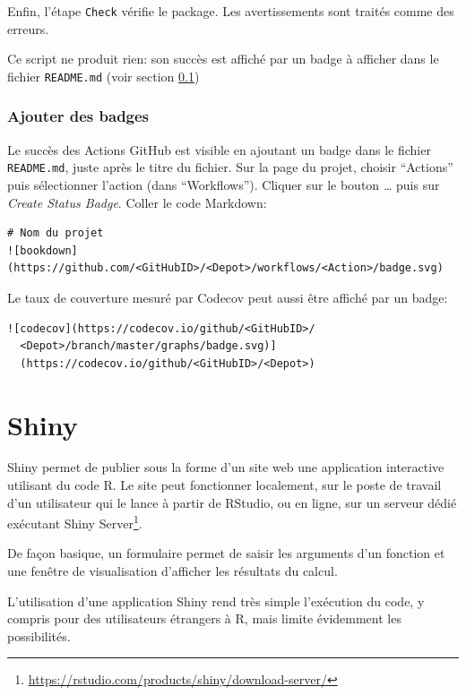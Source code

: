 \documentclass[
  11pt,
  french,
  a4paper,
  extrafontsizes,onecolumn,openright
  ]{memoir}
\begin{document}
Enfin, l'étape \texttt{Check} vérifie le package.
Les avertissements sont traités comme des erreurs.

Ce script ne produit rien: son succès est affiché par un badge à afficher dans le fichier \texttt{README.md} (voir section \ref{sec:ci-badges})

\hypertarget{sec:ci-badges}{%
\subsection{Ajouter des badges}\label{sec:ci-badges}}

Le succès des Actions GitHub est visible en ajoutant un badge dans le fichier \texttt{README.md}, juste après le titre du fichier.
Sur la page du projet, choisir ``Actions'' puis sélectionner l'action (dans ``Workflows'').
Cliquer sur le bouton \emph{\ldots{}} puis sur \emph{Create Status Badge}.
Coller le code Markdown:

\begin{verbatim}
# Nom du projet
![bookdown](https://github.com/<GitHubID>/<Depot>/workflows/<Action>/badge.svg)
\end{verbatim}

Le taux de couverture mesuré par Codecov peut aussi être affiché par un badge:

\begin{verbatim}
![codecov](https://codecov.io/github/<GitHubID>/
  <Depot>/branch/master/graphs/badge.svg)]
  (https://codecov.io/github/<GitHubID>/<Depot>)
\end{verbatim}

\hypertarget{chap:shiny}{%
\chapter{Shiny}\label{chap:shiny}}

Shiny permet de publier sous la forme d'un site web une application interactive utilisant du code R.
Le site peut fonctionner localement, sur le poste de travail d'un utilisateur qui le lance à partir de RStudio, ou en ligne, sur un serveur dédié exécutant Shiny Server\footnote{\url{https://rstudio.com/products/shiny/download-server/}}.

De façon basique, un formulaire permet de saisir les arguments d'un fonction et une fenêtre de visualisation d'afficher les résultats du calcul.

L'utilisation d'une application Shiny rend très simple l'exécution du code, y compris pour des utilisateurs étrangers à R, mais limite évidemment les possibilités.
\end{document}
